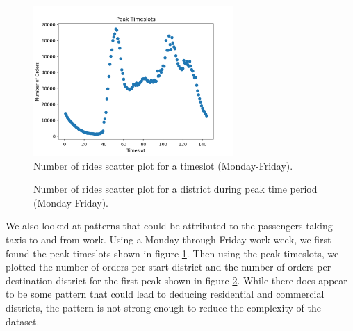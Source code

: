 \documentclass[paper=a4, fontsize=11pt]{scrartcl} %
\numberwithin{equation}{section} %
\numberwithin{table}{section} %
\begin{document}
\begin{figure}[!htb]
\centering
\includegraphics[width=3in]{figures/PeakTimeslots.png}
\caption{Number of rides scatter plot for a timeslot (Monday-Friday).}
\label{peak}
\end{figure}

\begin{figure}[!htb]
\centering
{}
\caption{Number of rides scatter plot for a district during peak time period (Monday-Friday).}
\label{peakDistrict}
\end{figure}

We also looked at patterns that could be attributed to the passengers taking taxis to and from work. Using a Monday through Friday work week, we first found the peak timeslots shown in figure \ref{peak}. Then using the peak timeslots, we plotted the number of orders per start district and the number of orders per destination district for the first peak shown in figure \ref{peakDistrict}. While there does appear to be some pattern that could lead to deducing residential and commercial districts, the pattern is not strong enough to reduce the complexity of the dataset.\\
\end{document}
